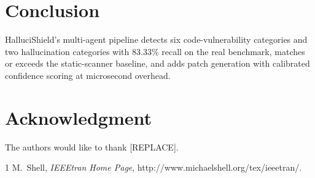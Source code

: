 \documentclass[conference]{IEEEtran}
\begin{document}
\section{Conclusion}
HalluciShield's multi-agent pipeline detects six code-vulnerability
categories and two hallucination categories with 83.33\% recall on the real
benchmark, matches or exceeds the static-scanner baseline, and adds patch
generation with calibrated confidence scoring at microsecond overhead.

\section*{Acknowledgment}
The authors would like to thank [REPLACE].

\begin{thebibliography}{1}
M.~Shell, \emph{IEEEtran Home Page},
http://www.michaelshell.org/tex/ieeetran/.
\end{thebibliography}
\end{document}
